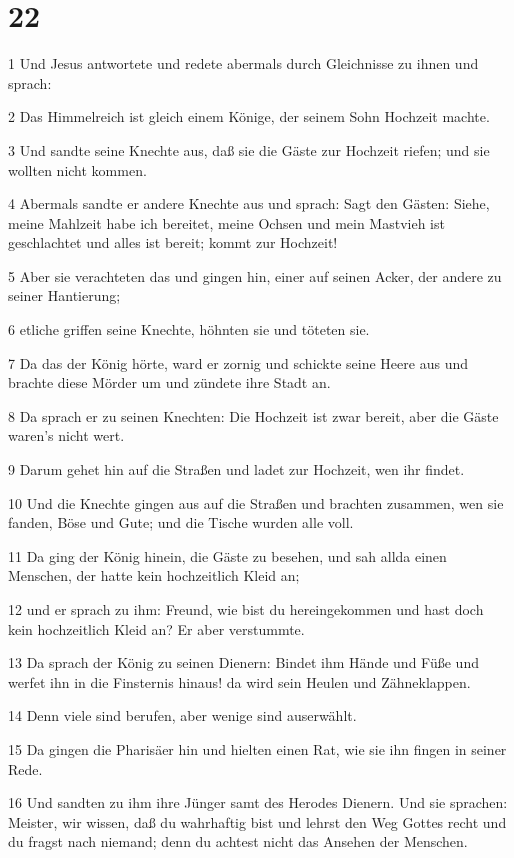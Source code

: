 \chapter{22}

\par 1 Und Jesus antwortete und redete abermals durch Gleichnisse zu ihnen und sprach:
\par 2 Das Himmelreich ist gleich einem Könige, der seinem Sohn Hochzeit machte.
\par 3 Und sandte seine Knechte aus, daß sie die Gäste zur Hochzeit riefen; und sie wollten nicht kommen.
\par 4 Abermals sandte er andere Knechte aus und sprach: Sagt den Gästen: Siehe, meine Mahlzeit habe ich bereitet, meine Ochsen und mein Mastvieh ist geschlachtet und alles ist bereit; kommt zur Hochzeit!
\par 5 Aber sie verachteten das und gingen hin, einer auf seinen Acker, der andere zu seiner Hantierung;
\par 6 etliche griffen seine Knechte, höhnten sie und töteten sie.
\par 7 Da das der König hörte, ward er zornig und schickte seine Heere aus und brachte diese Mörder um und zündete ihre Stadt an.
\par 8 Da sprach er zu seinen Knechten: Die Hochzeit ist zwar bereit, aber die Gäste waren's nicht wert.
\par 9 Darum gehet hin auf die Straßen und ladet zur Hochzeit, wen ihr findet.
\par 10 Und die Knechte gingen aus auf die Straßen und brachten zusammen, wen sie fanden, Böse und Gute; und die Tische wurden alle voll.
\par 11 Da ging der König hinein, die Gäste zu besehen, und sah allda einen Menschen, der hatte kein hochzeitlich Kleid an;
\par 12 und er sprach zu ihm: Freund, wie bist du hereingekommen und hast doch kein hochzeitlich Kleid an? Er aber verstummte.
\par 13 Da sprach der König zu seinen Dienern: Bindet ihm Hände und Füße und werfet ihn in die Finsternis hinaus! da wird sein Heulen und Zähneklappen.
\par 14 Denn viele sind berufen, aber wenige sind auserwählt.
\par 15 Da gingen die Pharisäer hin und hielten einen Rat, wie sie ihn fingen in seiner Rede.
\par 16 Und sandten zu ihm ihre Jünger samt des Herodes Dienern. Und sie sprachen: Meister, wir wissen, daß du wahrhaftig bist und lehrst den Weg Gottes recht und du fragst nach niemand; denn du achtest nicht das Ansehen der Menschen.
